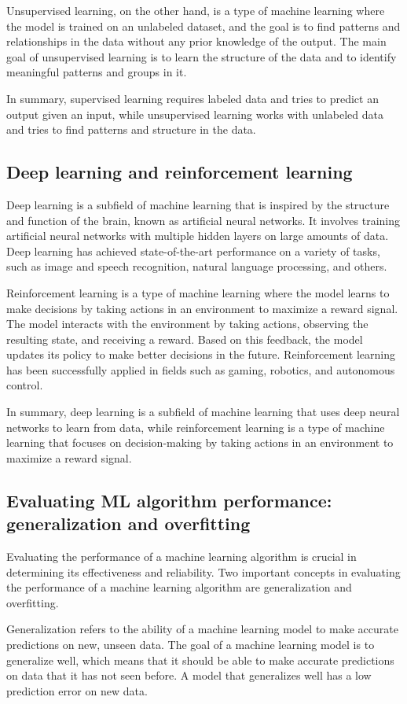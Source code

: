 \documentclass[12pt, a4paper, oneside]{article}
\begin{document}
Unsupervised learning, on the other hand, is a type of machine learning where the model is trained on an unlabeled dataset, and the goal is to find patterns and relationships in the data without any prior knowledge of the output. The main goal of unsupervised learning is to learn the structure of the data and to identify meaningful patterns and groups in it.

In summary, supervised learning requires labeled data and tries to predict an output given an input, while unsupervised learning works with unlabeled data and tries to find patterns and structure in the data.
\subsection{ Deep learning and reinforcement learning }
Deep learning is a subfield of machine learning that is inspired by the structure and function of the brain, known as artificial neural networks. It involves training artificial neural networks with multiple hidden layers on large amounts of data. Deep learning has achieved state-of-the-art performance on a variety of tasks, such as image and speech recognition, natural language processing, and others.

Reinforcement learning is a type of machine learning where the model learns to make decisions by taking actions in an environment to maximize a reward signal. The model interacts with the environment by taking actions, observing the resulting state, and receiving a reward. Based on this feedback, the model updates its policy to make better decisions in the future. Reinforcement learning has been successfully applied in fields such as gaming, robotics, and autonomous control.

In summary, deep learning is a subfield of machine learning that uses deep neural networks to learn from data, while reinforcement learning is a type of machine learning that focuses on decision-making by taking actions in an environment to maximize a reward signal.
\subsection{ Evaluating ML algorithm performance: generalization and overfitting }
Evaluating the performance of a machine learning algorithm is crucial in determining its effectiveness and reliability. Two important concepts in evaluating the performance of a machine learning algorithm are generalization and overfitting.

Generalization refers to the ability of a machine learning model to make accurate predictions on new, unseen data. The goal of a machine learning model is to generalize well, which means that it should be able to make accurate predictions on data that it has not seen before. A model that generalizes well has a low prediction error on new data.
\end{document}
